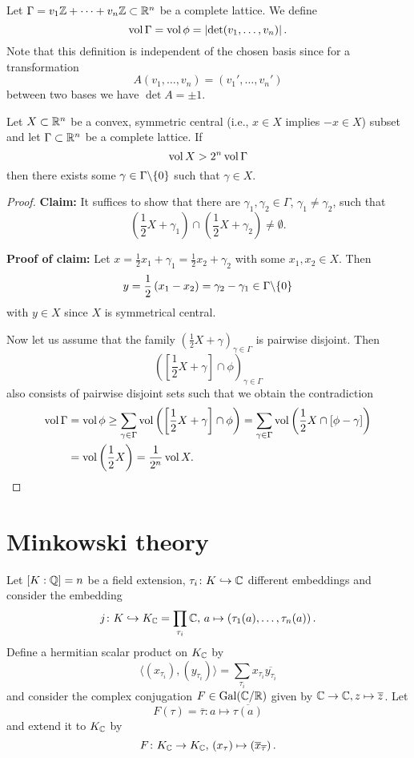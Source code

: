 
Let $\Gamma = v_1 \mathbb{Z} + \dots+ v_n \mathbb{Z} \subset \mathbb{R}^n$ be a complete lattice. We define
\[ \operatorname{vol} \Gamma = \operatorname{vol} \phi = \left|{ \det (v_1, \dots, v_n)}\right|.
\]
Note that this definition is independent of the chosen basis since for a transformation
\[ A (v_1, \dots, v_n)=(v_1', \dots, v_n')
\]
between two bases we have $\det A = \pm 1$.

\begin{Satz}[Minkowski]
Let $X \subset \mathbb{R}^n$ be a convex, symmetric central (i.e., $x \in X$ implies $-x \in X$) subset and let $\Gamma \subset \mathbb{R}^n$ be a complete lattice. If
\[ \operatorname{vol} X> 2^n \operatorname{vol} \Gamma
\]
then there exists some $\gamma \in \Gamma\backslash \{0\}$ such that $\gamma \in X$.
\end{Satz}

\begin{proof}
\textbf{Claim:} It suffices to show that there are $\gamma_1, \gamma_2 \in \Gamma$, $\gamma_1 \neq \gamma_2$, such that
\[ \left( \frac{1}{2}X + \gamma_1 \right) \cap \left( \frac{1}{2}X + \gamma_2 \right)
\neq \emptyset.
\]

\textbf{Proof of claim:} Let $x = \frac{1}{2} x_1 + \gamma_1 = \frac{1}{2} x_2 + \gamma_2$ with some $x_1, x_2 \in X$. Then
\[ y= \frac{1}{2} \left( x_1-x_2 \right) = \gamma_2- \gamma_1 \in \Gamma \backslash \{ 0 \}
\]
with $y \in X$ since $X$ is symmetrical central.

\bigskip
Now let us assume that the family $\left( \frac{1}{2}X + \gamma \right)_{ \gamma \in \Gamma }$ is pairwise disjoint. Then
\[ \left(\left[ \frac{1}{2}X + \gamma \right] \cap \phi \right)_{ \gamma \in \Gamma }
\]
also consists of pairwise disjoint sets such that we obtain the contradiction
\begin{align*}
\operatorname{vol} \Gamma
& = \operatorname{vol} \phi
\geq \sum_{\gamma \in \Gamma  } \operatorname{vol} \left(   \left[ \frac{1}{2}X + \gamma \right] \cap \phi\right)
= \sum_{\gamma \in \Gamma  } \operatorname{vol} \left(  \frac{1}{2}X \cap \left[  \phi - \gamma \right] \right) \\
& = \operatorname{vol} \left( \frac{1}{2}X \right)
= \frac{1}{2^n} \operatorname{vol} X.
\end{align*}
\end{proof}




\section{Minkowski theory}
Let $[K:\mathbb{Q}] = n$ be a field extension, $\tau_i \colon K \hookrightarrow \mathbb{C}$ different embeddings and consider the embedding
\[ j \colon K \hookrightarrow K_{\mathbb{C}} = \prod_{\tau_i} \mathbb{C}, \,
a \mapsto \left( \tau_1(a), \dots, \tau_n(a)  \right).
\]
Define a hermitian scalar product on $K_{\mathbb{C}}$ by
\[ \langle \left(x_{\tau_i} \right), \left(y_{\tau_i} \right) \rangle 
=\sum_{\tau_i} x_{\tau_i} \overline{y_{\tau_i}}
\]
and consider the complex conjugation $F \in \operatorname{Gal}(\mathbb{C}/ \mathbb{R})$ given by $\mathbb{C} \to \mathbb{C}, z \mapsto \overline{z}$. Let
\[ F(\tau) = \overline{\tau} \colon a \mapsto \overline{\tau(a)}
\]
and extend it to $K_{\mathbb{C}}$ by
\[ F \colon K_{\mathbb{C}} \to K_{\mathbb{C}}, \, \left(x_{\tau} \right) 
\mapsto \left(\overline{x}_{\overline{\tau}} \right).
\]

